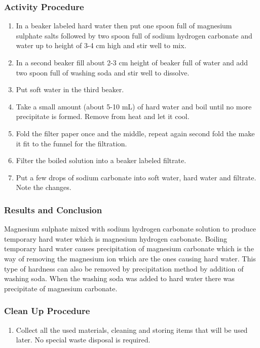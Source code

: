 \subsubsection*{Activity Procedure}
\begin{enumerate}
\item{In a beaker labeled hard water then put one spoon full of magnesium sulphate salts followed by two spoon full of sodium hydrogen carbonate and water up to height of 3-4 cm high and stir well to mix.}
\item{In a second beaker fill about 2-3 cm height of beaker full of water and add two spoon full of washing soda and stir well to dissolve.}
\item{Put soft water in the third beaker.}
\item{Take a small amount (about 5-10 mL) of hard water and boil until no more precipitate is formed. Remove from heat and let it cool.}
\item{Fold the filter paper once and the middle, repeat again second fold the make it fit to the funnel for the filtration.}
\item{Filter the boiled solution into a beaker labeled filtrate.}
\item{Put a few drops of sodium carbonate into soft water, hard water and filtrate. Note the changes.}
\end{enumerate}

\subsubsection*{Results and Conclusion}
Magnesium sulphate mixed with sodium hydrogen carbonate solution to produce temporary hard water which is magnesium hydrogen carbonate. Boiling temporary hard water causes precipitation of magnesium carbonate which is the way of removing the magnesium ion which are the ones causing hard water. This type of hardness can also be removed by precipitation method by addition of washing soda. When the washing soda was added to hard water there was precipitate of magnesium carbonate.

\subsubsection*{Clean Up Procedure}
\begin{enumerate}
\item{Collect all the used materials, cleaning and storing items that will be used later. No special waste disposal is required.}
\end{enumerate}

